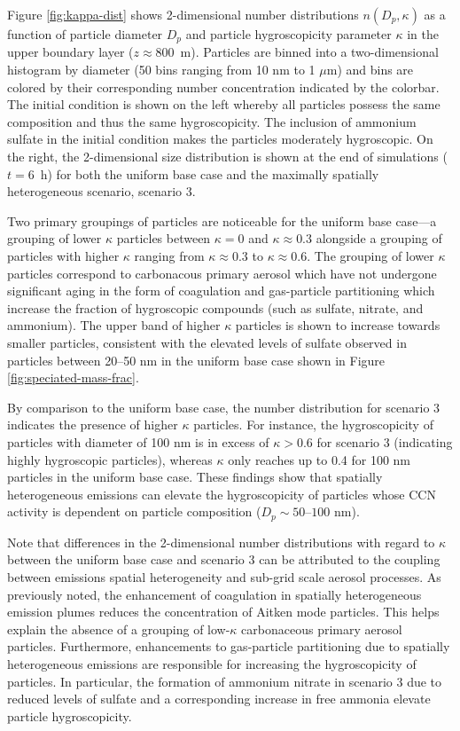 \documentclass[journal abbreviation, manuscript]{copernicus}
\begin{document}
Figure \ref{fig:kappa-dist} shows 2-dimensional number distributions $n(D_p, \kappa)$ as a function of particle diameter $D_p$ and particle hygroscopicity parameter $\kappa$ in the upper boundary layer ($z\approx 800$~m). Particles are binned into a two-dimensional histogram by diameter (50 bins ranging from 10 nm to 1 $\mu$m) and bins are colored by their corresponding number concentration indicated by the colorbar. The initial condition is shown on the left whereby all particles possess the same composition and thus the same hygroscopicity. The inclusion of ammonium sulfate in the initial condition makes the particles moderately hygroscopic. On the right, the 2-dimensional size distribution is shown at the end of simulations ($t=6$~h) for both the uniform base case and the maximally spatially heterogeneous scenario, scenario 3. 

Two primary groupings of particles are noticeable for the uniform base case---a grouping of lower $\kappa$ particles between $\kappa=0$ and $\kappa\approx0.3$ alongside a grouping of particles with higher $\kappa$ ranging from $\kappa\approx0.3$ to $\kappa\approx0.6$. The grouping of lower $\kappa$ particles correspond to carbonacous primary aerosol which have not undergone significant aging in the form of coagulation and gas-particle partitioning which increase the fraction of hygroscopic compounds (such as sulfate, nitrate, and ammonium). The upper band of higher $\kappa$ particles is shown to increase towards smaller particles, consistent with the elevated levels of sulfate observed in particles between 20--50 nm in the uniform base case shown in Figure \ref{fig:speciated-mass-frac}.

By comparison to the uniform base case, the number distribution for scenario 3 indicates the presence of higher $\kappa$ particles. For instance, the hygroscopicity of particles with diameter of 100 nm is in excess of $\kappa>0.6$ for scenario 3 (indicating highly hygroscopic particles), whereas $\kappa$ only reaches up to 0.4 for 100 nm particles in the uniform base case. These findings show that spatially heterogeneous emissions can elevate the hygroscopicity of particles whose CCN activity is dependent on particle composition ($D_p\sim50\text{--}100$ nm).  

Note that differences in the 2-dimensional number distributions with regard to $\kappa$ between the uniform base case and scenario 3 can be attributed to the coupling between emissions spatial heterogeneity and sub-grid scale aerosol processes. As previously noted, the enhancement of coagulation in spatially heterogeneous emission plumes reduces the concentration of Aitken mode particles. This helps explain the absence of a grouping of low-$\kappa$ carbonaceous primary aerosol particles. Furthermore, enhancements to gas-particle partitioning due to spatially heterogeneous emissions are responsible for increasing the hygroscopicity of particles. In particular, the formation of ammonium nitrate in scenario 3 due to reduced levels of sulfate and a corresponding increase in free ammonia elevate particle hygroscopicity. 
\end{document}
